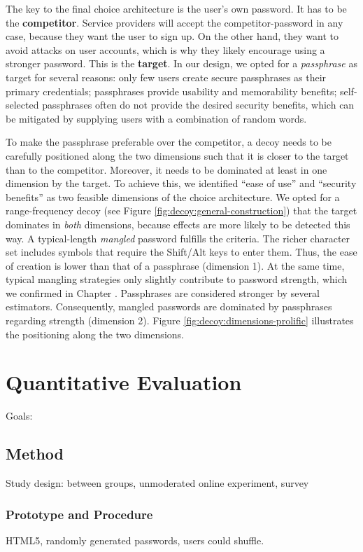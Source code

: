 The key to the final choice architecture is the user's own password. It has to be the \textbf{competitor}. Service providers will accept the competitor-password in any case, because they want the user to sign up. On the other hand, they want to avoid attacks on user accounts, which is why they likely encourage using a stronger password. This is the \textbf{target}. In our design, we opted for a \textit{passphrase} as target for several reasons: only few users create secure passphrases as their primary credentials; passphrases provide usability and memorability benefits; self-selected passphrases often do not provide the desired security benefits, which can be mitigated by supplying users with a combination of random words. 

To make the passphrase preferable over the competitor, a decoy needs to be carefully positioned along the two dimensions such that it is closer to the target than to the competitor. Moreover, it needs to be dominated at least in one dimension by the target. To achieve this, we identified ``ease of use'' and ``security benefits'' as two feasible dimensions of the choice architecture. We opted for a range-frequency decoy (see Figure \ref{fig:decoy:general-construction}) that the target dominates in \textit{both} dimensions, because effects are more likely to be detected this way. A typical-length \textit{mangled} password fulfills the criteria. The richer character set includes symbols that require the Shift/Alt keys to enter them. Thus, the ease of creation is lower than that of a passphrase (dimension 1). At the same time, typical mangling strategies only slightly contribute to password strength, which we confirmed in Chapter \cite{chap:pasdjo}. Passphrases are considered stronger by several estimators. Consequently, mangled passwords are dominated by passphrases regarding strength (dimension 2). Figure \ref{fig:decoy:dimensions-prolific} illustrates the positioning along the two dimensions.

\section{Quantitative Evaluation}
Goals:
\subsection{Method}
Study design: between groups, unmoderated online experiment, survey

\subsubsection{Prototype and Procedure}
HTML5, randomly generated passwords, users could shuffle. 

